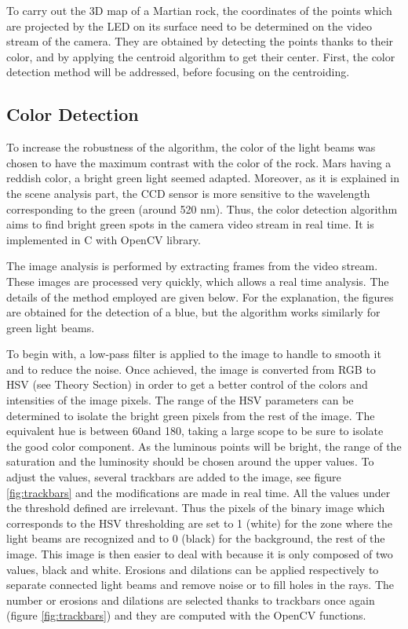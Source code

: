 To carry out the 3D map of a Martian rock, the coordinates of the points which are projected by the LED on its surface need to be determined on the video stream of the camera. They are obtained by detecting the points thanks to their color, and by applying the centroid algorithm to get their center. First, the color detection method will be addressed, before focusing on the centroiding.

\subsection{Color Detection}

To increase the robustness of the algorithm, the color of the light beams was chosen to have the maximum contrast with the color of the rock. Mars having a reddish color, a bright green light seemed adapted. Moreover, as it is explained in the scene analysis part, the CCD sensor is more sensitive to the wavelength corresponding to the green (around 520 nm). Thus, the color detection algorithm aims to find bright green spots in the camera video stream in real time. It is implemented in C with OpenCV library. 

The image analysis is performed by extracting frames from the video stream. These images are processed very quickly, which allows a real time analysis. The details of the method employed are given below. For the explanation, the figures are obtained for the detection of a blue, but the algorithm works similarly for green light beams.

To begin with, a low-pass filter is applied to the image to handle to smooth it and to reduce the noise. Once achieved, the image is converted from RGB to HSV (see Theory Section) in order to get a better control of the colors and intensities of the image pixels. The range of the HSV parameters can be determined to isolate the bright green pixels from the rest of the image. The equivalent hue is between 60\degree and 180\degree, taking a large scope to be sure to isolate the good color component. As the luminous points will be bright, the range of the saturation and the luminosity should be chosen around the upper values. To adjust the values, several trackbars are added to the image, see figure \ref{fig:trackbars} and the modifications are made in real time. All the values under the threshold defined are irrelevant. Thus the pixels of the binary image which corresponds to the HSV thresholding are set to 1 (white) for the zone where the light beams are recognized and to 0 (black) for the background, the rest of the image. This image is then easier to deal with because it is only composed of two values, black and white. Erosions and dilations can be applied respectively to separate connected light beams and remove noise or to fill holes in the rays. The number or erosions and dilations are selected thanks to trackbars once again (figure \ref{fig:trackbars}) and they are computed with the OpenCV functions. 

